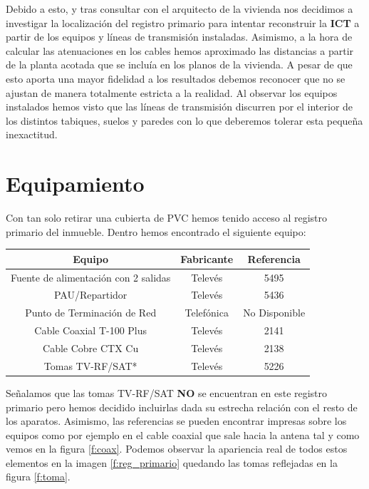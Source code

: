\documentclass{article}[12 pt]
\begin{document}
		Debido a esto, y tras consultar con el arquitecto de la vivienda nos decidimos a investigar la localización del registro primario para intentar reconstruir la \textbf{ICT} a partir de los equipos y líneas de transmisión instaladas. Asimismo, a la hora de calcular las atenuaciones en los cables hemos aproximado las distancias a partir de la planta acotada que se incluía en los planos de la vivienda. A pesar de que esto aporta una mayor fidelidad a los resultados debemos reconocer que no se ajustan de manera totalmente estricta a la realidad. Al observar los equipos instalados hemos visto que las líneas de transmisión discurren por el interior de los distintos tabiques, suelos y paredes con lo que deberemos tolerar esta pequeña inexactitud.

	\section{Equipamiento}
		Con tan solo retirar una cubierta de PVC hemos tenido acceso al registro primario del inmueble. Dentro hemos encontrado el siguiente equipo:

		\vskip 3mm

		\begin{center}
			\begin{tabular}{| c | c | c |}
				\hline
				\textbf{Equipo} & \textbf{Fabricante} & \textbf{Referencia}\\
				\hline
				Fuente de alimentación con 2 salidas & Televés & 5495\\
				\hline
				PAU/Repartidor & Televés & 5436\\
				\hline
				Punto de Terminación de Red & Telefónica & No Disponible\\
				\hline
				Cable Coaxial T-100 Plus & Televés & 2141\\
				\hline
				Cable Cobre CTX Cu & Televés & 2138\\
				\hline
				Tomas TV-RF/SAT* & Televés & 5226\\
				\hline
			\end{tabular}
		\end{center}

		\vskip 3mm

		Señalamos que las tomas TV-RF/SAT \textbf{NO} se encuentran en este registro primario pero hemos decidido incluirlas dada su estrecha relación con el resto de los aparatos. Asimismo, las referencias se pueden encontrar impresas sobre los equipos como por ejemplo en el cable coaxial que sale hacia la antena tal y como vemos en la figura \ref{f:coax}. Podemos observar la apariencia real de todos estos elementos en la imagen \ref{f:reg_primario} quedando las tomas reflejadas en la figura \ref{f:toma}.
\end{document}
